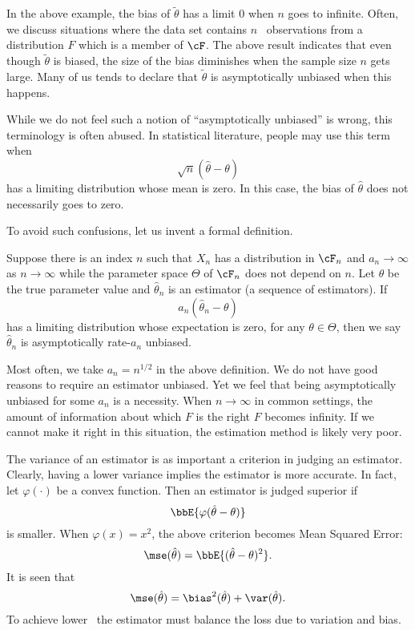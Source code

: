 In the above example, the bias of $\tilde \theta$ has a limit 0
when $n$ goes to infinite. Often, we discuss situations where
the data set contains $n$ \iid\ observations from a distribution
$F$ which is a member of $\cF$. The above result indicates
that even though $\tilde \theta$ is biased, the size of the
bias diminishes when the sample size $n$ gets large.
Many of us tends to declare that $\tilde \theta$ is asymptotically
unbiased when this happens.

While we do not feel such a notion of ``asymptotically unbiased''
is wrong, this terminology is often abused. In statistical literature,
people may use this term when
\[
\sqrt{n} (\hat \theta - \theta) 
\]
has a limiting distribution whose mean is zero. In this case, the bias
of $\hat \theta$ does not necessarily goes to zero.

To avoid such confusions, let us invent a formal definition.

\begin{defi}
Suppose there is an index $n$ such that $X_n$ has a distribution
in $\cF_n$ and $a_n \to \infty$ as $n \to \infty$ while the parameter
space $\Theta$ of $\cF_n$ does not depend on $n$. Let $\theta$
be the true parameter value and $\hat \theta_n$ is an estimator
(a sequence of estimators).
If 
\[
a_n(\hat \theta_n - \theta)
\]
has a limiting distribution whose expectation is zero, for any $\theta \in \Theta$,
then we say $\hat \theta_n$ is asymptotically rate-$a_n$ unbiased.
\end{defi}


Most often, we take $a_n = n^{1/2}$ in the above definition.
We do not have good reasons to require an estimator unbiased. 
Yet we feel that being asymptotically unbiased for
some $a_n$ is a necessity. When
$n \to \infty$ in common settings, the amount of information about
which $F$ is the right $F$ becomes infinity. If we cannot make
it right in this situation, the estimation method is likely very poor.

The variance of an estimator is as important a criterion in judging
an estimator. Clearly, having a lower variance implies the estimator
is more accurate. In fact, let $\varphi(\cdot)$ be a convex function.
Then an estimator is judged superior if
\[
\bbE\{\varphi(\hat \theta - \theta)\}
\]
is smaller. When $\varphi(x) = x^2$, the above criterion becomes
Mean Squared Error:
\[
\mse (\hat \theta)
= \bbE \{ (\hat \theta - \theta)^2\}.
\]
It is seen that
\[
\mse (\hat \theta) = \bias^2 (\hat \theta) + \var(\hat \theta).
\]
To achieve lower \mse\, the estimator must balance the
loss due to variation and bias. 

